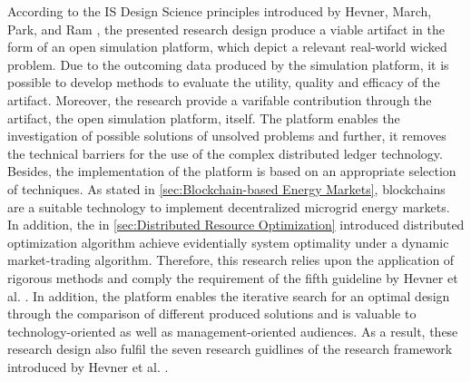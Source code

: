 According to the IS Design Science principles introduced by Hevner, March, Park, and Ram \cite{hevner2008design}, the presented research design produce a viable artifact in the form of an open simulation platform, which depict a relevant real-world wicked problem. Due to the outcoming data produced by the simulation platform, it is possible to develop methods to evaluate the utility, quality and efficacy of the artifact. Moreover, the research provide a varifable contribution through the artifact, the open simulation platform, itself. The platform enables the investigation of possible solutions of unsolved problems and further, it removes the technical barriers for the use of the complex distributed ledger technology. Besides, the implementation of the platform is based on an appropriate selection of techniques. As stated in \ref{sec:Blockchain-based Energy Markets}, blockchains are a suitable technology to implement decentralized microgrid energy markets. In addition, the in \ref{sec:Distributed Resource Optimization} introduced distributed optimization algorithm achieve evidentially system optimality under a dynamic market-trading algorithm. Therefore, this research relies upon the application of rigorous methods and comply the requirement of the fifth guideline by Hevner et al. \cite{hevner2008design}. In addition, the platform enables the iterative search for an optimal design through the comparison of different produced solutions and is valuable to technology-oriented as well as management-oriented audiences. As a result, these research design also fulfil the seven research guidlines of the research framework introduced by Hevner et al. \cite{hevner2008design}. 

